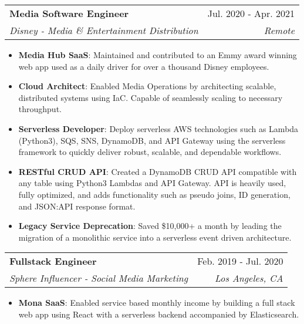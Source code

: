\documentclass[letterpaper,12pt]{article}
\makeatletter
\newcommand{\resumeItem}[2]{
  \item\normalsize{
    \textbf{#1}{: #2 \vspace{-2pt}}
  }
}
\newcommand{\resumeSubheading}[4]{
  \vspace{-1pt}\item
    \begin{tabular*}{0.97\textwidth}[t]{l@{\extracolsep{\fill}}r}
      \textbf{#1} & #2 \\
      \textit{\small#3} & \textit{\small #4} \\
    \end{tabular*}\vspace{-5pt}
}
\newcommand{\resumeItemListStart}{\begin{itemize}}
\newcommand{\resumeItemListEnd}{\end{itemize}\vspace{-5pt}}
\makeatother
\begin{document}
\resumeSubheading
{Media Software Engineer} {Jul. 2020 - Apr. 2021}
{Disney - Media \& Entertainment Distribution}{Remote}
\resumeItemListStart
\resumeItem{Media Hub SaaS}
{Maintained and contributed to an Emmy award winning web app used as a daily driver for over a thousand Disney employees. }
\resumeItem{Cloud Architect}
{Enabled Media Operations by architecting scalable, distributed systems using IaC. Capable of seamlessly scaling to necessary throughput.}
\resumeItem{Serverless Developer}
{Deploy serverless AWS technologies such as Lambda (Python3), SQS, SNS, DynamoDB, and API Gateway using the serverless framework to quickly deliver robust, scalable, and dependable workflows.}
\resumeItem{RESTful CRUD API}
{Created a DynamoDB CRUD API compatible with any table using Python3 Lambdas and API Gateway. API is heavily used, fully optimized, and adds functionality such as pseudo joins, ID generation, and JSON:API response format.}
\resumeItem{Legacy Service Deprecation}
{Saved \$10,000+ a month by leading the migration of a monolithic service into a serverless event driven architecture.}

\resumeItemListEnd

\resumeSubheading
{Fullstack Engineer} {Feb. 2019 - Jul. 2020}
{Sphere Influencer - Social Media Marketing}{Los Angeles, CA}
\resumeItemListStart
\resumeItem{Mona SaaS}
{Enabled service based monthly income by building a full stack web app using React with a serverless backend accompanied by Elasticsearch.}
\resumeItemListEnd
\end{document}
